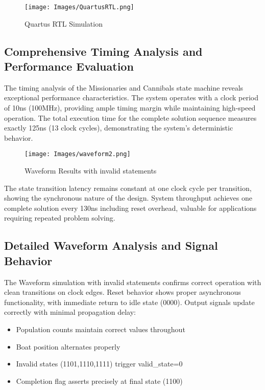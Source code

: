 \documentclass[10pt,a4paper]{article}
\begin{document}
\begin{figure}[h]
    \centering
    \texttt{[image: Images/QuartusRTL.png]}
    \caption{Quartus RTL Simulation}
    \label{fig:coverage}
\end{figure}

\subsection*{Comprehensive Timing Analysis and Performance Evaluation}

The timing analysis of the Missionaries and Cannibals state machine reveals exceptional performance characteristics. The system operates with a clock period of 10ns (100MHz), providing ample timing margin while maintaining high-speed operation. The total execution time for the complete solution sequence measures exactly 125ns (13 clock cycles), demonstrating the system's deterministic behavior.

\begin{figure}[h]
    \centering
    \texttt{[image: Images/waveform2.png]}
    \caption{Waveform Results with invalid statements}
    \label{fig:coverage}
\end{figure}

\noindent The state transition latency remains constant at one clock cycle per transition, showing the synchronous nature of the design. System throughput achieves one complete solution every 130ns including reset overhead, valuable for applications requiring repeated problem solving.

\subsection*{Detailed Waveform Analysis and Signal Behavior}

The Waveform simulation with invalid statements confirms correct operation with clean transitions on clock edges. Reset behavior shows proper asynchronous functionality, with immediate return to idle state (0000). Output signals update correctly with minimal propagation delay:


\begin{itemize}
    \item Population counts maintain correct values throughout
    \item Boat position alternates properly
    \item Invalid states (1101,1110,1111) trigger valid\_state=0
    \item Completion flag asserts precisely at final state (1100)
\end{itemize}
\end{document}
